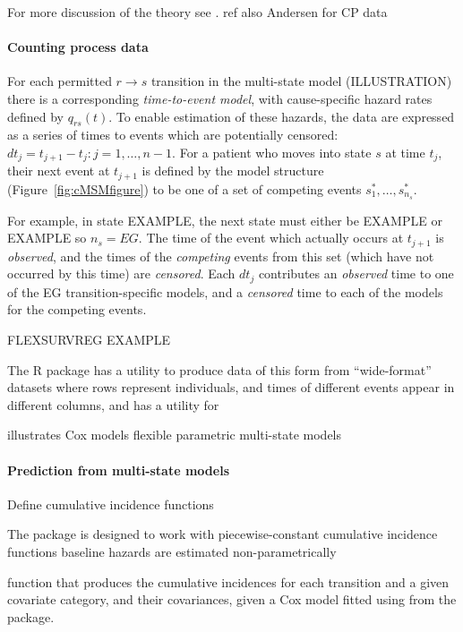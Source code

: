 \documentclass[nojss,nofooter]{jss}
\begin{document}
For more discussion of the theory see \citet{putter:mstate}. ref also
Andersen for CP data

\paragraph{Counting process data}
For each permitted $r \rightarrow s$ transition in the multi-state
model (ILLUSTRATION) there is a corresponding \emph{time-to-event
  model}, with cause-specific hazard rates defined by $q_{rs}(t)$. To
enable estimation of these hazards, the data are expressed as a series
of times to events which are potentially censored: $dt_{j} = t_{j+1} -
t_{j}: j = 1,\ldots,n-1$. For a patient who moves into state $s$ at
time $t_{j}$, their next event at $t_{j+1}$ is defined by the model
structure (Figure~\ref{fig:cMSMfigure}) to be one of a set of
competing events $s^*_1,\ldots,s^*_{n_s}$.

For example, in state EXAMPLE, the next state must either be EXAMPLE
or EXAMPLE so $n_s=EG$.  The time of the event which actually occurs
at $t_{j+1}$ is \emph{observed}, and the times of the \emph{competing}
events from this set (which have not occurred by this time) are
\emph{censored}.  Each $dt_{j}$ contributes an \emph{observed} time to
one of the EG transition-specific models, and a \emph{censored} time
to each of the models for the competing events.

FLEXSURVREG EXAMPLE

The  R package \citep{mstate:cmpb,mstate:jss} has a
utility  to produce data of this form from
``wide-format'' datasets where rows represent individuals, and times
of different events appear in different columns, and  has
a utility  for 

illustrates Cox models
flexible parametric multi-state models 

\paragraph{Prediction from multi-state models}

Define cumulative incidence functions

The  package is designed to work with 
piecewise-constant cumulative incidence functions
baseline hazards are estimated non-parametrically 
\citep{mstate:cmpb,mstate:jss} 

function  that produces the cumulative incidences for each transition and a given covariate category, and their covariances, given a Cox model fitted using  from the  package. 
\end{document}
